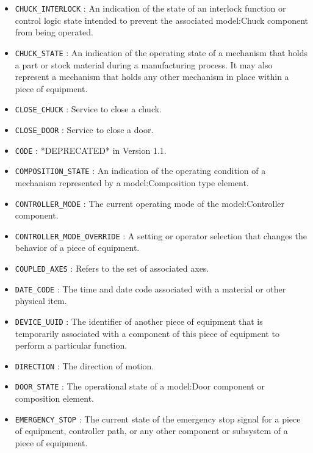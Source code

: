 \begin{itemize}
\item \texttt{CHUCK_INTERLOCK} : An indication of the state of an interlock function or control logic state intended to prevent the associated {model:Chuck} component from being operated. 

\item \texttt{CHUCK_STATE} : An indication of the operating state of a mechanism that holds a part or stock material during a manufacturing process. It may also represent a mechanism that holds any other mechanism in place within a piece of equipment. 

\item \texttt{CLOSE_CHUCK} : Service to close a chuck. 

\item \texttt{CLOSE_DOOR} : Service to close a door. 

\item \texttt{CODE} : *DEPRECATED* in Version 1.1. 

\item \texttt{COMPOSITION_STATE} : An indication of the operating condition of a mechanism represented by a {model:Composition} type element. 

\item \texttt{CONTROLLER_MODE} : The current operating mode of the {model:Controller} component. 

\item \texttt{CONTROLLER_MODE_OVERRIDE} : A setting or operator selection that changes the behavior of a piece of equipment. 

\item \texttt{COUPLED_AXES} : Refers to the set of associated axes. 

\item \texttt{DATE_CODE} : The time and date code associated with a material or other physical item. 

\item \texttt{DEVICE_UUID} : The identifier of another piece of equipment that is temporarily associated with a component of this piece of equipment to perform a particular function. 

\item \texttt{DIRECTION} : The direction of motion. 

\item \texttt{DOOR_STATE} : The operational state of a {model:Door} component or composition element. 

\item \texttt{EMERGENCY_STOP} : The current state of the emergency stop signal for a piece of equipment, controller path, or any other component or subsystem of a piece of equipment. 


\end{itemize}
